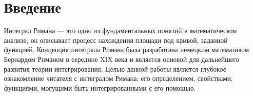 \section*{Введение} 

Интеграл Римана — это одно из фундаментальных понятий в математическом анализе,
он описывает процесс нахождения площади под кривой, заданной функцией.
Концепция интеграла Римана была разработана немецким математиком Бернардом
Риманом в середине XIX века и является основой для дальнейшего развития теории
интегрирования.
Целью данной работы является глубокое ознакомление читателя с интегралом Римана: его определением, свойствами, функциями, могущими быть интегрированными с его помощью.

